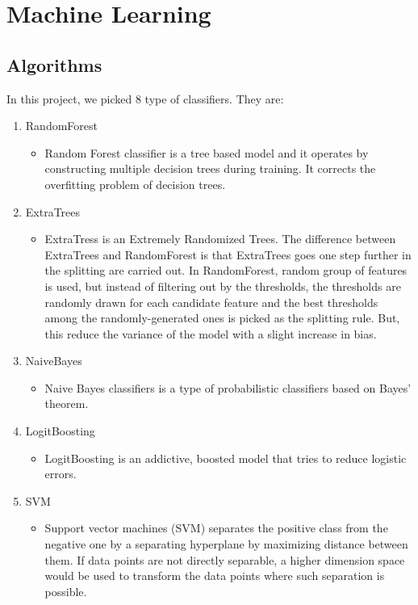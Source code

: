 \chapter{Machine Learning}

\section{Algorithms}
In this project, we picked 8 type of classifiers. They are:
\begin{enumerate}
    \item RandomForest
        \begin{itemize}
            \item Random Forest classifier is a tree based model and it operates by constructing multiple decision trees during training. It corrects the overfitting problem of decision trees.
        \end{itemize}
    \item ExtraTrees
        \begin{itemize}
            \item  
            ExtraTress is an Extremely Randomized Trees. The difference between ExtraTrees and RandomForest is that ExtraTrees goes one step further in the splitting are carried out. In RandomForest, random group of features is used, but instead of filtering out by the thresholds, the thresholds are randomly drawn for each candidate feature and the best thresholds among the randomly-generated ones is picked as the splitting rule. But, this reduce the variance of the model with a slight increase in bias.
        \end{itemize}
    \item NaiveBayes
        \begin{itemize}
            \item Naive Bayes classifiers is a type of probabilistic classifiers based on Bayes' theorem. 
        \end{itemize}
    \item LogitBoosting
        \begin{itemize}
            \item LogitBoosting is an addictive, boosted model that tries to reduce logistic errors.
        \end{itemize}
    \item SVM
        \begin{itemize}
            \item Support vector machines (SVM) separates the positive class from the negative one by a separating hyperplane by maximizing distance between them. If data points are not directly separable, a higher dimension space would be used to transform the data points where such separation is possible.

\end{itemize}
\end{enumerate}
